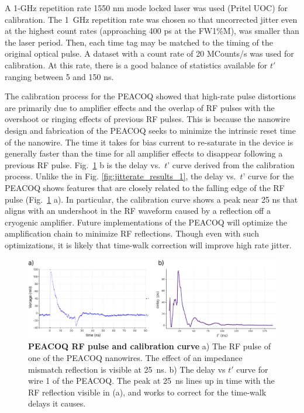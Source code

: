 \documentclass[11pt]{caltech_thesis} %
\begin{document}
A 1-GHz repetition rate 1550 nm mode locked laser was used (Pritel UOC) for calibration. The 1~GHz repetition rate was chosen so that uncorrected jitter even at the highest count rates (approaching 400 ps at the FW1\%M), was smaller than the laser period. Then, each time tag may be matched to the timing of the original optical pulse. A dataset with a count rate of 20 MCounts/s was used for calibration. At this rate, there is a good balance of statistics available for $t'$ ranging between 5 and 150 ns.

The calibration process for the PEACOQ showed that high-rate pulse distortions are primarily due to amplifier effects and the overlap of RF pulses with the overshoot or ringing effects of previous RF pulses. This is because the nanowire design and fabrication of the PEACOQ seeks to minimize the intrinsic reset time of the nanowire. The time it takes for bias current to re-saturate in the device is generally faster than the time for all amplifier effects to disappear following a previous RF pulse. Fig.~\ref{fig:order_1st} b is the delay vs.~$t’$ curve derived from the calibration process. Unlike the in Fig. \ref{fig:jitterate_results_1}, the delay vs.~$t’$ curve for the PEACOQ shows features that are closely related to the falling edge of the RF pulse (Fig.~\ref{fig:order_1st} a). In particular, the calibration curve shows a peak near 25 ns that aligns with an undershoot in the RF waveform caused by a reflection off a cryogenic amplifier. Future implementations of the PEACOQ will optimize the amplification chain to minimize RF reflections. Though even with such optimizations, it is likely that time-walk correction will improve high rate jitter.

\hypertarget{fig:order_1st}{%
\begin{figure}
\centering
\includegraphics[width=1\textwidth,height=\textheight]{./chapter_03/figs/SOM_Figure_order_1st_v2_light.pdf}
\caption[{PEACOQ RF pulse and calibration curve}]{\textbf{PEACOQ RF pulse and calibration curve} a) The RF pulse of one of the PEACOQ nanowires. The effect of an impedance mismatch reflection is visible at 25~ns. b) The delay vs $t'$ curve for wire 1 of the PEACOQ. The peak at 25~ns lines up in time with the RF reflection visible in (a), and works to correct for the time-walk delays it causes.}
\label{fig:order_1st}
\end{figure}
}
\end{document}
